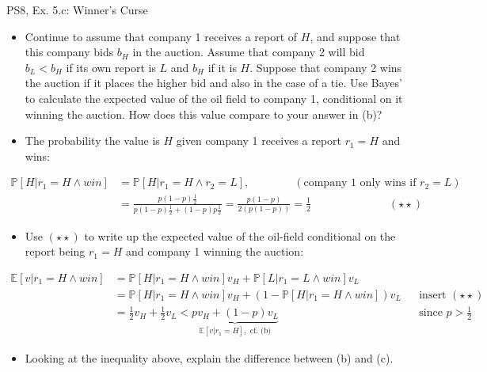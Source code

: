 \begin{frame}{PS8, Ex. 5.c: Winner's Curse}
      \begin{itemize}
        \item[(c)] Continue to assume that company 1 receives a report of $H$, and suppose that this company bids $b_H$ in the auction. Assume that company 2 will bid $b_L < b_H$ if its own report is $L$ and $b_H$ if it is $H$. Suppose that company 2 wins the auction if it places the higher bid and also in the case of a tie. Use Bayes’ to calculate the expected value of the oil field to company 1, conditional on it winning the auction. How does this value compare to your answer in (b)?
        \item[Step 1:] The probability the value is $H$ given company 1 receives a report $r_1=H$ and wins:
        \end{itemize}
        \vspace{-8pt}
        \begin{align*}
          \mathbb{P}[H|r_1=H\wedge win]&=\mathbb{P}[H|r_1=H\wedge r_2=L],\quad\quad\quad\quad(\text{company 1 only wins if }r_2=L)\\
            &=\frac{p(1-p)\frac{1}{2}}{p(1-p)\frac{1}{2}+(1-p)p\frac{1}{2}}=\frac{p(1-p)}{2(p(1-p))}=\frac{1}{2}\quad\quad\quad\quad\quad\quad\quad(\star\star)
        \end{align*}
        \vspace{-8pt}
        \begin{itemize}
        \item[Step 2:] Use $(\star\star)$ to write up the expected value of the oil-field conditional on the report being $r_1=H$ and company 1 winning the auction:
      \end{itemize}
      \vspace{-4pt}
      \begin{align*}
        \mathbb{E}[v|r_1=H\wedge win]&=\mathbb{P}[H|r_1=H\wedge win]v_H+\mathbb{P}[L|r_1=L\wedge win]v_L\\
        &=\mathbb{P}[H|r_1=H\wedge win]v_H+\left(1-\mathbb{P}[H|r_1=H\wedge win]\right)v_L&&\text{insert }(\star\star)\\
        &=\frac{1}{2}v_H+\frac{1}{2}v_L<\underbrace{pv_H+(1-p)v_L}_{\textstyle\mathbb{E}[v|r_1=H],\text{ cf. (b)}}&&\text{since }p>\frac{1}{2}
      \end{align*}
      \vspace{-10pt}
      \begin{itemize}
        \item[Step 3:] Looking at the inequality above, explain the difference between (b) and (c).
      \end{itemize}
      \vfill\null
\end{frame}

